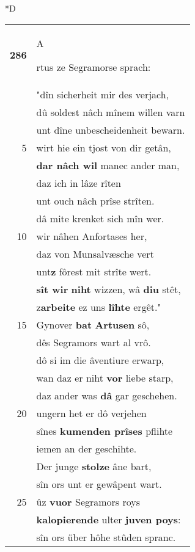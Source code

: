 \documentclass[8pt,a4paper,notitlepage]{article}
\begin{document}
\begin{table}[ht]
\begin{minipage}[t]{0.5\linewidth}
\small
\begin{center}*D
\end{center}
\begin{tabular}{rl}
\textbf{286} & \begin{large}A\end{large}rtus ze Segramorse sprach:\\ 
 & "dîn sicherheit mir des verjach,\\ 
 & dû soldest nâch mînem willen varn\\ 
 & unt dîne unbescheidenheit bewarn.\\ 
5 & wirt hie ein tjost von dir getân,\\ 
 & \textbf{dar nâch wil} manec ander man,\\ 
 & daz ich in lâze rîten\\ 
 & unt ouch nâch prîse strîten.\\ 
 & dâ mite krenket sich mîn wer.\\ 
10 & wir nâhen Anfortases her,\\ 
 & daz von Munsalvæsche vert\\ 
 & unt\textbf{z} fôrest mit strîte wert.\\ 
 & \textbf{sît wir} \textbf{niht} wizzen, wâ \textbf{diu} stêt,\\ 
 & z\textbf{arbeite} ez uns \textbf{lîhte} ergêt."\\ 
15 & Gynover \textbf{bat} \textbf{Artusen} sô,\\ 
 & dês Segramors wart al vrô.\\ 
 & dô si im die âventiure erwarp,\\ 
 & wan daz er niht \textbf{vor} liebe starp,\\ 
 & daz ander was \textbf{dâ} gar geschehen.\\ 
20 & ungern het er dô verjehen\\ 
 & sînes \textbf{kumenden prîses} pflihte\\ 
 & iemen an der geschihte.\\ 
 & Der junge \textbf{stolze} âne bart,\\ 
 & sîn ors unt er gewâpent wart.\\ 
25 & ûz \textbf{vuor} Segramors roys\\ 
 & \textbf{kalopierende} ulter \textbf{juven poys}:\\ 
 & sîn ors über hôhe stûden spranc.\\ 

\end{tabular}
\end{minipage}
\end{table}
\end{document}
